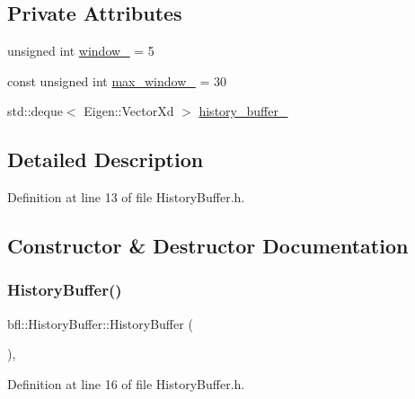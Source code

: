 \subsection*{Private Attributes}
\begin{DoxyCompactItemize}
\item 
unsigned int \mbox{\hyperlink{classbfl_1_1HistoryBuffer_a135dd1829747ba2f414f12fd8282f75a}{window\+\_\+}} = 5
\item 
const unsigned int \mbox{\hyperlink{classbfl_1_1HistoryBuffer_aeb4d2b9c58f06177b0daaf640e2b6c9e}{max\+\_\+window\+\_\+}} = 30
\item 
std\+::deque$<$ Eigen\+::\+Vector\+Xd $>$ \mbox{\hyperlink{classbfl_1_1HistoryBuffer_a31dcf97b1b7fc9e97b8dd4774e24e4d7}{history\+\_\+buffer\+\_\+}}
\end{DoxyCompactItemize}


\subsection{Detailed Description}


Definition at line 13 of file History\+Buffer.\+h.



\subsection{Constructor \& Destructor Documentation}
\mbox{\label{classbfl_1_1HistoryBuffer_a0b0c850ed4a50eeb7eb3d88e10937c1b}} 
\subsubsection{\texorpdfstring{History\+Buffer()}{HistoryBuffer()}\hspace{0.1cm}{\footnotesize\ttfamily [1/2]}}
{\footnotesize\ttfamily bfl\+::\+History\+Buffer\+::\+History\+Buffer (\begin{DoxyParamCaption}{ }\end{DoxyParamCaption})\hspace{0.3cm}{\ttfamily [inline]}, {\ttfamily [noexcept]}}



Definition at line 16 of file History\+Buffer.\+h.

